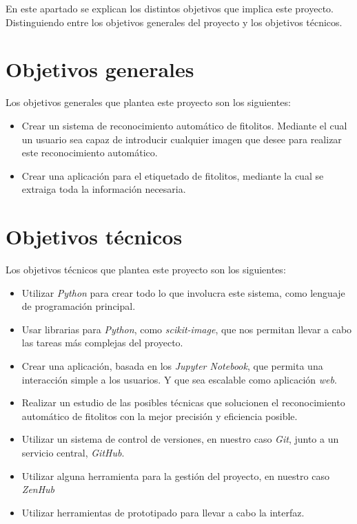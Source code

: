 

En este apartado se explican los distintos objetivos que implica este proyecto. Distinguiendo entre los objetivos generales del proyecto y los objetivos técnicos.

\section{Objetivos generales}

Los objetivos generales que plantea este proyecto son los siguientes:

\begin{itemize}
	\item Crear un sistema de reconocimiento automático de fitolitos. Mediante el cual un usuario sea capaz de introducir cualquier imagen que desee para realizar este reconocimiento automático.
	\item Crear una aplicación para el etiquetado de fitolitos, mediante la cual se extraiga toda la información necesaria.
\end{itemize}

\section{Objetivos técnicos}

Los objetivos técnicos que plantea este proyecto son los siguientes:

\begin{itemize}
	\item Utilizar \textit{Python} para crear todo lo que involucra este sistema, como lenguaje de programación principal.
	\item Usar librarias para \textit{Python}, como \textit{scikit-image}, que nos permitan llevar a cabo las tareas más complejas del proyecto.
	\item Crear una aplicación, basada en los \textit{Jupyter Notebook}, que permita una interacción simple a los usuarios. Y que sea escalable como aplicación \textit{web}.
	\item Realizar un estudio de las posibles técnicas que solucionen el reconocimiento automático de fitolitos con la mejor precisión y eficiencia posible.
	\item Utilizar un sistema de control de versiones, en nuestro caso \textit{Git}, junto a un servicio central, \textit{GitHub}.
	\item Utilizar alguna herramienta para la gestión del proyecto, en nuestro caso \textit{ZenHub}
	\item Utilizar herramientas de prototipado para llevar a cabo la interfaz.
\end{itemize}
